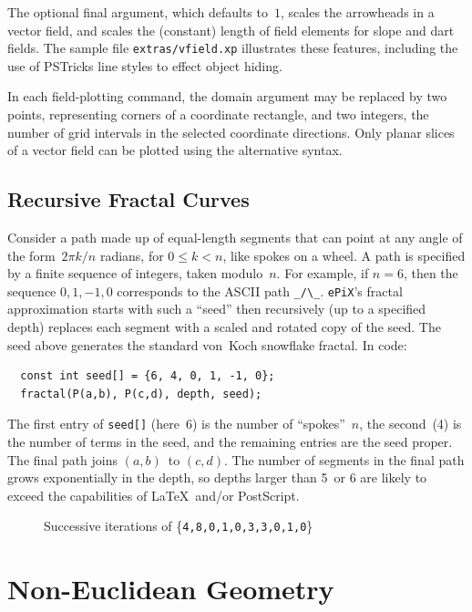 \documentclass[12pt]{report}
\newcommand{\code}[1]{\texttt{#1}}
\newcommand{\filename}[1]{\texttt{#1}}
\newcommand{\ePiX}{\code{ePiX}}
\begin{document}
The optional final argument, which defaults to~$1$, scales the
arrowheads in a vector field, and scales the (constant) length of
field elements for slope and dart fields. The sample file
\filename{extras/vfield.xp} illustrates these features, including the
use of PSTricks line styles to effect object hiding.

In each field-plotting command, the domain argument may be replaced by
two points, representing corners of a coordinate rectangle, and two
integers, the number of grid intervals in the selected coordinate
directions. Only planar slices of a vector field can be plotted using
the alternative syntax.  
 


\subsection*{Recursive Fractal Curves}  

Consider a path made up of equal-length segments that can point at any
angle of the form~$2\pi k/n$ radians, for $0\leq k<n$, like spokes on
a wheel. A path is specified by a finite sequence of integers, taken
modulo~$n$. For example, if $n=6$, then the sequence $0, 1, -1, 0$
corresponds to the ASCII path \verb+_/\_+.  \ePiX's fractal
approximation starts with such a ``seed'' then recursively (up to a
specified depth) replaces each segment with a scaled and rotated copy
of the seed. The seed above generates the standard von~Koch snowflake
fractal. In code:
\begin{verbatim}
  const int seed[] = {6, 4, 0, 1, -1, 0};
  fractal(P(a,b), P(c,d), depth, seed);
\end{verbatim}
The first entry of \code{seed[]} (here~6) is the number of
``spokes''~$n$, the second~(4) is the number of terms in the seed, and
the remaining entries are the seed proper. The final path joins
$(a,b)$~to $(c,d)$. The number of segments in the final path grows
exponentially in the depth, so depths larger than 5~or 6 are
likely to exceed the capabilities of \LaTeX\ and/or PostScript.
\begin{figure}[hbt]
  \begin{center}
  
  \end{center}
  \caption{Successive iterations of \{\code{4,8,0,1,0,3,3,0,1,0}\}}
\end{figure}


\section{Non-Euclidean Geometry}
\label{section:non-eucl}
\end{document}
